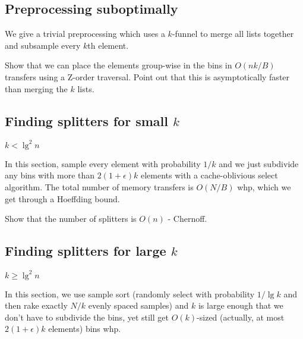 \subsection*{Preprocessing suboptimally}

We give a trivial preprocessing which uses a $k$-funnel to merge all lists
together and subsample every $k$th element.  

Show that we can place the elements group-wise in the bins in $O(nk/B)$ transfers
using a Z-order traversal.  Point out that this is asymptotically faster than
merging the $k$ lists.

\subsection*{Finding splitters for small $k$}

$k < \lg^2 n$

In this section, sample every element with probability $1/k$ and we just subdivide any bins
with more than $2(1+\epsilon)k$ elements with a cache-oblivious select algorithm.
The total number of memory transfers is $O(N/B)$ whp, which we get through a Hoeffding
bound.

Show that the number of splitters is $O(n)$ - Chernoff.

\subsection*{Finding splitters for large $k$}

$k \geq \lg ^2 n$

In this section, we use sample sort (randomly select with probability $1/\lg k$ and
then rake exactly $N/k$ evenly spaced samples) and $k$ is large enough that we don't have
to subdivide the bins, yet still get $O(k)$-sized (actually, at most 
$2(1+\epsilon)k$ elements) bins whp.  



